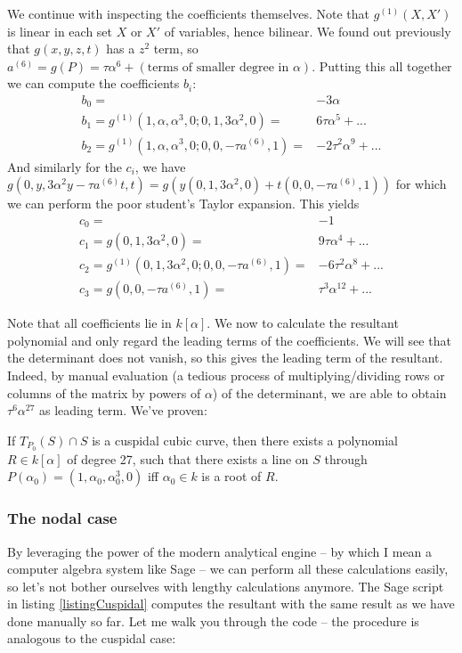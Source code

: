 We continue with inspecting the coefficients themselves.
Note that $g^{(1)}(X,X')$ is linear in each set $X$ or $X'$ of variables, hence bilinear.
We found out previously that $g(x,y,z,t)$ has a $z^2$ term, so $a^{(6)} = g(P) = \tau\alpha^6 + (\text{terms of smaller degree in } \alpha)$.
Putting this all together we can compute the coefficients $b_i$:
\begin{align}
b_0 =& -3\alpha \\
b_1 = g^{(1)}(1,\alpha,\alpha^3,0;0,1,3\alpha^2,0) =& 6\tau\alpha^5 + ... \\
b_2 = g^{(1)}(1,\alpha,\alpha^3,0;0,0,-\tau a^{(6)},1) =& -2\tau^2\alpha^9 + ...
\end{align}
And similarly for the $c_i$, we have $g(0,y,3\alpha^2y-\tau a^{(6)}t,t) = g(y(0,1,3\alpha^2,0)+t(0,0,-\tau a^{(6)},1))$ for which we can perform the poor student's Taylor expansion. This yields
\begin{align}
c_0 =& -1\\
c_1 = g(0,1,3\alpha^2,0) =& 9\tau\alpha^4 + ... \\
c_2 = g^{(1)}(0,1,3\alpha^2,0;0,0,-\tau a^{(6)},1) =& -6\tau^2\alpha^8 + ... \\
c_3 = g(0,0,-\tau a^{(6)},1) =& \tau^3\alpha^{12} + ...
\end{align}

Note that all coefficients lie in $k[\alpha]$.
We now to calculate the resultant polynomial and only regard the leading terms of the coefficients.
We will see that the determinant does not vanish, so this gives the leading term of the resultant.
Indeed, by manual evaluation (a tedious process of multiplying/dividing rows or columns of the matrix by powers of $\alpha$) of the determinant, we are able to obtain $\tau^6\alpha^{27} $ as leading term.
We've proven:
\begin{proposition}
If $T_{P_0}(S) \cap S$ is a cuspidal cubic curve, then there exists a polynomial $R \in k[\alpha]$ of degree 27, such that there exists a line on $S$ through $P(\alpha_0) = (1,\alpha_0,\alpha_0^3,0)$ iff $\alpha_0 \in k$ is a root of $R$.
\end{proposition}

\subsubsection{The nodal case}
By leveraging the power of the modern analytical engine -- by which I mean a computer algebra system like Sage \cite{sagemath2014} -- we can perform all these calculations easily, so let's not bother ourselves with lengthy calculations anymore.
The Sage script in listing \ref{listingCuspidal} computes the resultant with the same result as we have done manually so far.
Let me walk you through the code -- the procedure is analogous to the cuspidal case:

